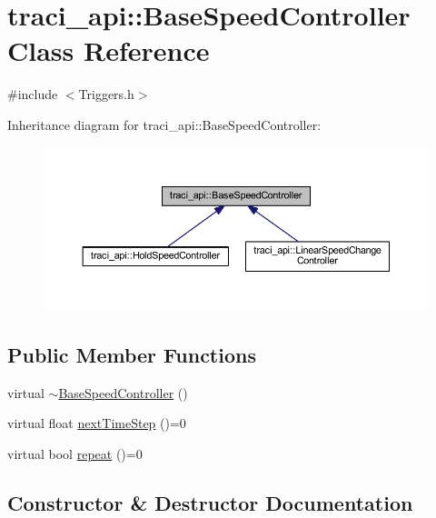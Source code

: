 \hypertarget{classtraci__api_1_1_base_speed_controller}{}\section{traci\+\_\+api\+:\+:Base\+Speed\+Controller Class Reference}
\label{classtraci__api_1_1_base_speed_controller}


{\ttfamily \#include $<$Triggers.\+h$>$}



Inheritance diagram for traci\+\_\+api\+:\+:Base\+Speed\+Controller\+:
\nopagebreak
\begin{figure}[H]
\begin{center}
\leavevmode
\includegraphics[width=350pt]{classtraci__api_1_1_base_speed_controller__inherit__graph}
\end{center}
\end{figure}
\subsection*{Public Member Functions}
\begin{DoxyCompactItemize}
\item 
virtual \hyperlink{classtraci__api_1_1_base_speed_controller_a7cabfad7b110f2463c62fe9e1d882043}{$\sim$\+Base\+Speed\+Controller} ()
\item 
virtual float \hyperlink{classtraci__api_1_1_base_speed_controller_ab9658ce36f91de8a34bb710b3241c210}{next\+Time\+Step} ()=0
\item 
virtual bool \hyperlink{classtraci__api_1_1_base_speed_controller_a2d4b22945d4cb27f5fe24b05700021b6}{repeat} ()=0
\end{DoxyCompactItemize}


\subsection{Constructor \& Destructor Documentation}
\mbox{\label{classtraci__api_1_1_base_speed_controller_a7cabfad7b110f2463c62fe9e1d882043}} 
